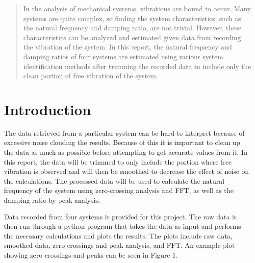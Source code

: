 \documentclass[11pt]{article}
\begin{document}
\newpage
\thispagestyle{empty}
\begin{abstract}
\vspace{-0.2in}
In the analysis of mechanical systems, vibrations are bound to occur. Many systems are quite complex, so finding the system characteristics, such as the natural frequency and damping ratio, are not trivial. However, these characteristics can be analyzed and estimated given data from recording the vibration of the system. In this report, the natural frequency and damping ratios of four systems are estimated using various system identification methods after trimming the recorded data to include only the clean portion of free vibration of the system.
\end{abstract} 

\newpage

\setcounter{page}{1} 


\section{Introduction}
\label{sec:intro}
\vspace{-0.2in}
The data retrieved from a particular system can be hard to interpret because of excessive noise clouding the results. Because of this it is important to clean up the data as much as possible before attempting to get accurate values from it. In this report, the data will be trimmed to only include the portion where free vibration is observed and will then be smoothed to decrease the effect of noise on the calculations. The processed data will be used to calculate the natural frequency of the system using zero-crossing analysis and FFT, as well as the damping ratio by peak analysis.
\bigskip

Data recorded from four systems is provided for this project. The raw data is then run through a python program that takes the data as input and performs the necessary calculations and plots the results. The plots include raw data, smoothed data, zero crossings and peak analysis, and FFT. An example plot showing zero crossings and peaks can be seen in Figure 1.
\bigskip
	
\end{document}

